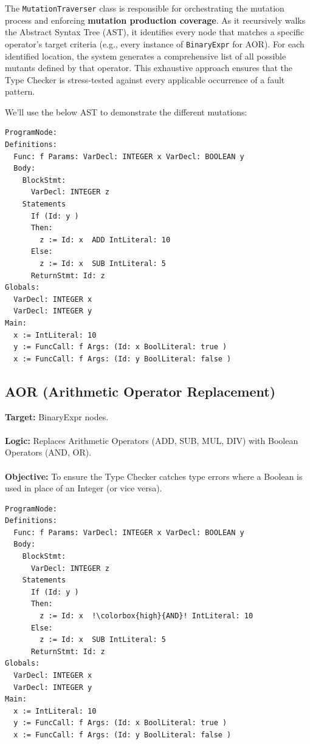 \documentclass[titlepage]{article}
\begin{document}
The \texttt{MutationTraverser} class is responsible for orchestrating the mutation process and enforcing \textbf{mutation production coverage}. As it recursively walks the Abstract Syntax Tree (AST), it identifies every node that matches a specific operator's target criteria (e.g., every instance of \texttt{BinaryExpr} for AOR). For each identified location, the system generates a comprehensive list of all possible mutants defined by that operator. This exhaustive approach ensures that the Type Checker is stress-tested against every applicable occurrence of a fault pattern.

We'll use the below AST to demonstrate the different mutations:

\begin{lstlisting}[caption={Original AST}, label={lst:orig_ast}]
ProgramNode:
Definitions: 
  Func: f Params: VarDecl: INTEGER x VarDecl: BOOLEAN y 
  Body:
    BlockStmt:
      VarDecl: INTEGER z 
    Statements
      If (Id: y )
      Then:
        z := Id: x  ADD IntLiteral: 10 
      Else:
        z := Id: x  SUB IntLiteral: 5 
      ReturnStmt: Id: z 
Globals: 
  VarDecl: INTEGER x 
  VarDecl: INTEGER y 
Main: 
  x := IntLiteral: 10 
  y := FuncCall: f Args: (Id: x BoolLiteral: true )
  x := FuncCall: f Args: (Id: y BoolLiteral: false )
\end{lstlisting}

\newpage

\subsection{AOR (Arithmetic Operator Replacement)}

\textbf{Target:} BinaryExpr nodes. \\ \\
\textbf{Logic:} Replaces Arithmetic Operators (ADD, SUB, MUL, DIV) with Boolean Operators (AND, OR). \\ \\
\textbf{Objective:} To ensure the Type Checker catches type errors where a Boolean is used in place of an Integer (or vice versa).

\begin{lstlisting}[escapechar=!, caption={AOR Mutated AST (Killed)}, label={lst:aor_mut_ast}]
ProgramNode:
Definitions: 
  Func: f Params: VarDecl: INTEGER x VarDecl: BOOLEAN y 
  Body:
    BlockStmt:
      VarDecl: INTEGER z 
    Statements
      If (Id: y )
      Then:
        z := Id: x  !\colorbox{high}{AND}! IntLiteral: 10 
      Else:
        z := Id: x  SUB IntLiteral: 5 
      ReturnStmt: Id: z 
Globals: 
  VarDecl: INTEGER x 
  VarDecl: INTEGER y 
Main: 
  x := IntLiteral: 10 
  y := FuncCall: f Args: (Id: x BoolLiteral: true )
  x := FuncCall: f Args: (Id: y BoolLiteral: false )
\end{lstlisting}
\end{document}
